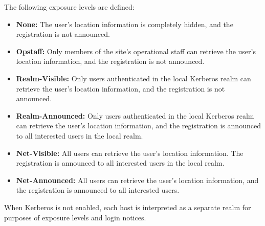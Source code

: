 The following exposure levels are defined:

\begin{itemize}
\item {\bf None:} The user's location information is completely hidden, and the
registration is not announced.
\item {\bf Opstaff:} Only members of the site's operational staff can
retrieve the user's location information, and the registration is not
announced.
\item {\bf Realm-Visible:} Only users authenticated in the local
Kerberos realm can retrieve the user's location information, and the
registration is not announced.
\item {\bf Realm-Announced:} Only users authenticated in the local
Kerberos realm can retrieve the user's location information, and the
registration is announced to all interested users in the local realm.
\item {\bf Net-Visible:} All users can retrieve the user's location
information.  The registration is announced to all interested users
in the local realm. 
\item {\bf Net-Announced:} All users can retrieve the user's location
information, and the registration is announced to all interested users.
\end{itemize}
When Kerberos is not enabled, each host is interpreted as a separate
realm for purposes of exposure levels and login notices.
